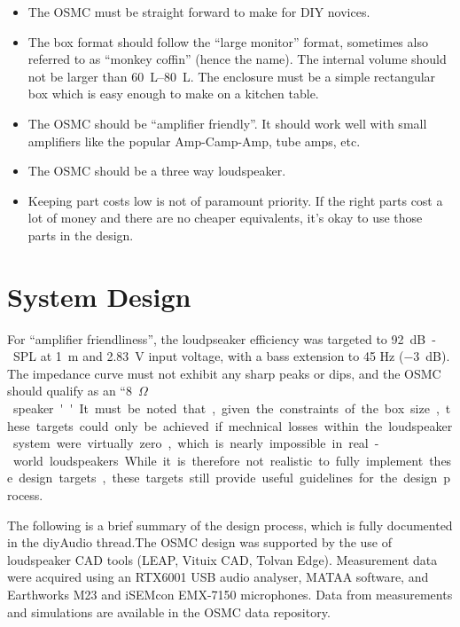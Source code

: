 \documentclass[12pt,a4paper]{article}
\begin{document}
\begin{itemize}
\item The OSMC must be straight forward to make for DIY novices.
\item The box format should follow the ``large monitor'' format, sometimes also referred to as ``monkey coffin'' (hence the name). The internal volume should not be larger than \SIrange{60}{80}{L}. The enclosure must be a simple rectangular box which is easy enough to make on a kitchen table.
\item The OSMC should be ``amplifier friendly''. It should work well with small amplifiers like the popular Amp-Camp-Amp, tube amps, etc.
\item The OSMC should be a three way loudspeaker.
\item Keeping part costs low is not of paramount priority. If the right parts cost a lot of money and there are no cheaper equivalents, it's okay to use those parts in the design.
\end{itemize}

\clearpage


\section{System Design}

For ``amplifier friendliness'', the loudpseaker efficiency was targeted to \SI{92}{dB-SPL} at \SI{1}{m} and \SI{2.83}{V} input voltage, with a bass extension to 45 Hz (\SI{-3}{dB}). The impedance curve must not exhibit any sharp peaks or dips, and the OSMC should qualify as an ``\SI{8}{$\Omega$} speaker''. It must be noted that, given the constraints of the box size, these targets could only be achieved if mechnical losses within the loudspeaker system were virtually zero, which is nearly impossible in real-world loudspeakers. While it is therefore not realistic to fully implement these design targets, these targets still provide useful guidelines for the design process.\par

The following is a brief summary of the design process, which is fully documented in the diyAudio thread.\cite{osmc_p1}The OSMC design was supported by the use of loudspeaker CAD tools (LEAP, Vituix CAD, Tolvan Edge). Measurement data were acquired using an RTX6001 USB audio analyser, MATAA software, and Earthworks M23 and iSEMcon EMX-7150 microphones. Data from measurements and simulations are available in the OSMC data repository\cite{osmc_datarepo}.
\end{document}
